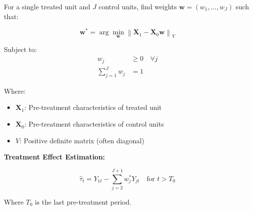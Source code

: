 For a single treated unit and $J$ control units, find weights $\mathbf{w} = (w_1, \ldots, w_J)$ such that:

\begin{equation}
\mathbf{w}^* = \arg\min_{\mathbf{w}} \left\| \mathbf{X}_1 - \mathbf{X}_0 \mathbf{w} \right\|_V
\end{equation}

Subject to:
\begin{align}
w_j &\geq 0 \quad \forall j \\
\sum_{j=1}^J w_j &= 1
\end{align}

Where:
\begin{itemize}
    \item $\mathbf{X}_1$: Pre-treatment characteristics of treated unit
    \item $\mathbf{X}_0$: Pre-treatment characteristics of control units
    \item $V$: Positive definite matrix (often diagonal)
\end{itemize}

\textbf{Treatment Effect Estimation:}

\begin{equation}
\hat{\tau}_t = Y_{1t} - \sum_{j=2}^{J+1} w_j^* Y_{jt} \quad \text{for } t > T_0
\end{equation}

Where $T_0$ is the last pre-treatment period.

